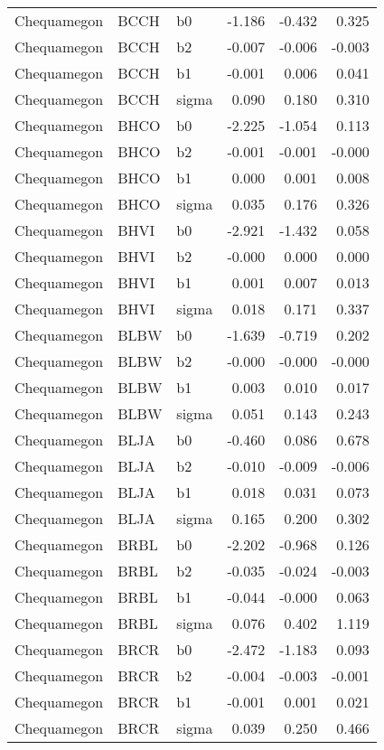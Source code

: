\begin{table}[ht]
\begin{center}
\begin{tabular}{lllrrr}
  Chequamegon & BCCH & b0 & -1.186 & -0.432 & 0.325 \\ 
  Chequamegon & BCCH & b2 & -0.007 & -0.006 & -0.003 \\ 
  Chequamegon & BCCH & b1 & -0.001 & 0.006 & 0.041 \\ 
  Chequamegon & BCCH & sigma & 0.090 & 0.180 & 0.310 \\ 
  Chequamegon & BHCO & b0 & -2.225 & -1.054 & 0.113 \\ 
  Chequamegon & BHCO & b2 & -0.001 & -0.001 & -0.000 \\ 
  Chequamegon & BHCO & b1 & 0.000 & 0.001 & 0.008 \\ 
  Chequamegon & BHCO & sigma & 0.035 & 0.176 & 0.326 \\ 
  Chequamegon & BHVI & b0 & -2.921 & -1.432 & 0.058 \\ 
  Chequamegon & BHVI & b2 & -0.000 & 0.000 & 0.000 \\ 
  Chequamegon & BHVI & b1 & 0.001 & 0.007 & 0.013 \\ 
  Chequamegon & BHVI & sigma & 0.018 & 0.171 & 0.337 \\ 
  Chequamegon & BLBW & b0 & -1.639 & -0.719 & 0.202 \\ 
  Chequamegon & BLBW & b2 & -0.000 & -0.000 & -0.000 \\ 
  Chequamegon & BLBW & b1 & 0.003 & 0.010 & 0.017 \\ 
  Chequamegon & BLBW & sigma & 0.051 & 0.143 & 0.243 \\ 
  Chequamegon & BLJA & b0 & -0.460 & 0.086 & 0.678 \\ 
  Chequamegon & BLJA & b2 & -0.010 & -0.009 & -0.006 \\ 
  Chequamegon & BLJA & b1 & 0.018 & 0.031 & 0.073 \\ 
  Chequamegon & BLJA & sigma & 0.165 & 0.200 & 0.302 \\ 
  Chequamegon & BRBL & b0 & -2.202 & -0.968 & 0.126 \\ 
  Chequamegon & BRBL & b2 & -0.035 & -0.024 & -0.003 \\ 
  Chequamegon & BRBL & b1 & -0.044 & -0.000 & 0.063 \\ 
  Chequamegon & BRBL & sigma & 0.076 & 0.402 & 1.119 \\ 
  Chequamegon & BRCR & b0 & -2.472 & -1.183 & 0.093 \\ 
  Chequamegon & BRCR & b2 & -0.004 & -0.003 & -0.001 \\ 
  Chequamegon & BRCR & b1 & -0.001 & 0.001 & 0.021 \\ 
  Chequamegon & BRCR & sigma & 0.039 & 0.250 & 0.466 \\ 

\end{tabular}
\end{center}
\end{table}
